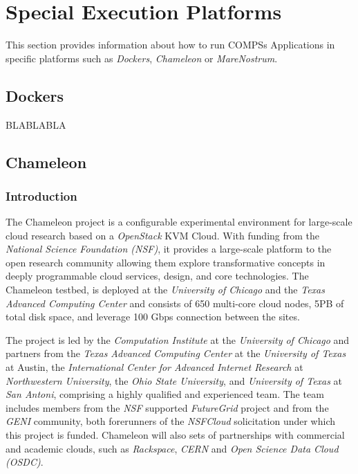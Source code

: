 \section{Special Execution Platforms}
\label{sec:Execution_Platfors}

This section provides information about how to run COMPSs Applications in specific platforms such as \textit{Dockers},
\textit{Chameleon} or \textit{MareNostrum}.


\subsection{Dockers}
BLABLABLA


\subsection{Chameleon}

\subsubsection{Introduction}

The Chameleon project is a configurable experimental environment for large-scale cloud research based on a \textit{OpenStack} 
KVM Cloud. With funding from the \textit{National Science Foundation (NSF)}, it provides a large-scale platform to the open research
community allowing them explore transformative concepts in deeply programmable cloud services, design, and core technologies. The 
Chameleon testbed, is deployed at the \textit{University of Chicago} and the \textit{Texas Advanced Computing Center} and consists of
650 multi-core cloud nodes, 5PB of total disk space, and leverage 100 Gbps connection between the sites. 

The project is led by the \textit{Computation Institute} at the \textit{University of Chicago} and partners from the \textit{Texas 
Advanced Computing Center} at the \textit{University of Texas} at Austin, the \textit{International Center for Advanced Internet 
Research} at \textit{Northwestern University}, the \textit{Ohio State University}, and \textit{University of Texas} at \textit{San
Antoni}, comprising a highly qualified and experienced team. The team includes members from the \textit{NSF} supported 
\textit{FutureGrid} project and from the \textit{GENI} community, both forerunners of the \textit{NSFCloud} solicitation under 
which this project is funded. Chameleon will also sets of partnerships with commercial and academic clouds, such as \textit{Rackspace},
\textit{CERN} and \textit{Open Science Data Cloud (OSDC)}.

